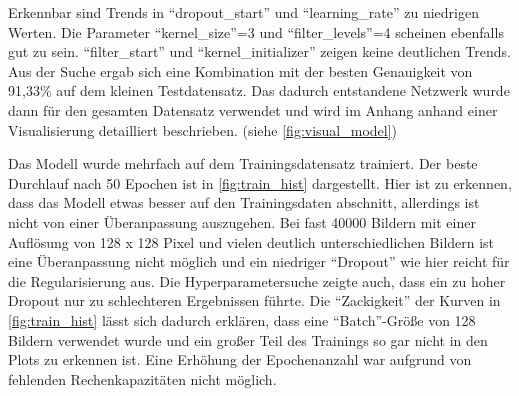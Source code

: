 \begin{table}
    \centering
    \caption{Die besten fünf Ergebnisse der zufälligen Gittersuche mit der Genauigkeit auf den 3000 Testdaten und den zugehörigen Hyperparametern}
    \label{tab:grid_search}
\end{table}

Erkennbar sind Trends in \enquote{dropout\_start} und \enquote{learning\_rate} zu niedrigen Werten.
Die Parameter \enquote{kernel\_size}=3 und \enquote{filter\_levels}=4 scheinen ebenfalls gut zu sein.
\enquote{filter\_start} und \enquote{kernel\_initializer} zeigen keine deutlichen Trends.
Aus der Suche ergab sich eine Kombination mit der besten Genauigkeit von 91,33\% auf dem kleinen Testdatensatz.
Das dadurch entstandene Netzwerk wurde dann für den gesamten Datensatz verwendet und wird im Anhang anhand einer Visualisierung detailliert beschrieben. (siehe \autoref{fig:visual_model})

Das Modell wurde mehrfach auf dem Trainingsdatensatz trainiert. 
Der beste Durchlauf nach 50 Epochen ist in \autoref{fig:train_hist} dargestellt.
Hier ist zu erkennen, dass das Modell etwas besser auf den Trainingsdaten abschnitt, allerdings ist nicht von einer Überanpassung auszugehen.
Bei fast 40000 Bildern mit einer Auflösung von 128 x 128 Pixel und vielen deutlich unterschiedlichen Bildern ist eine Überanpassung nicht möglich 
und ein niedriger \enquote{Dropout} wie hier reicht für die Regularisierung aus.
Die Hyperparametersuche zeigte auch, dass ein zu hoher Dropout nur zu schlechteren Ergebnissen führte.
Die \enquote{Zackigkeit} der Kurven in \autoref{fig:train_hist} lässt sich dadurch erklären, dass eine \enquote{Batch}-Größe von 128 Bildern verwendet wurde und ein großer Teil des Trainings so gar nicht in den Plots zu erkennen ist.
Eine Erhöhung der Epochenanzahl war aufgrund von fehlenden Rechenkapazitäten nicht möglich.

